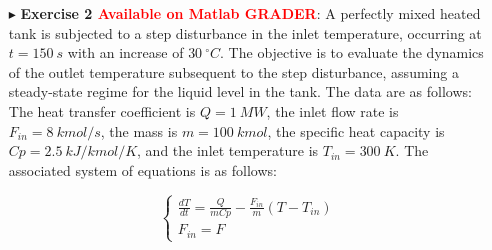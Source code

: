 \documentclass[xcolor={dvipsnames,rgb}, aspectratio=169]{beamer}
\begin{document}
\begin{frame}{}
   \begin{itemize}
      \item[$\blacktriangleright$] \textbf{Exercise 2 \textcolor{red}{Available on Matlab
         GRADER}}: \small{A perfectly mixed heated tank is subjected to a step
         disturbance in the inlet temperature, occurring at $t=150 \: s$ with an increase
         of $30 \: ^{\circ}C$. The objective is to evaluate the dynamics of the outlet
         temperature subsequent to the step disturbance, assuming a steady-state regime
         for the liquid level in the tank. The data are as follows: The heat transfer
         coefficient is $Q = 1 \:MW$, the inlet flow rate is $F_{in} = 8 \: kmol/s$, the
         mass is $m = 100 \: kmol$, the specific heat capacity is $Cp = 2.5 \:
         kJ/kmol/K$, and the inlet temperature is $T_{in} = 300 \: K$. The associated
         system of equations is as follows:}

         \begin{equation*}
            \begin{cases}
               \frac{dT}{dt} = \frac{Q}{mCp} - \frac{F_{in}}{m}\left(T-T_{in}\right) \\
               F_{in} = F
            \end{cases}
         \end{equation*}
   \end{itemize}
\end{frame}
\end{document}
